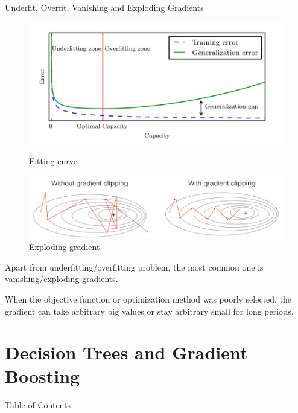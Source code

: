 \documentclass{beamer}
\theoremstyle{remark}
\begin{document}
\begin{frame}{Underfit, Overfit, Vanishing and Exploding Gradients}
    \begin{figure}
        \centering
        \begin{minipage}{0.5\textwidth}
            \centering
            \includegraphics[width=\textwidth]{pictures/train_vs_validate.png}
            \caption{Fitting curve}
        \end{minipage}\hfill
        \begin{minipage}{0.5\textwidth}
            \centering
            \includegraphics[width=\textwidth]{pictures/gradclip.png}
            \caption{Exploding gradient}
        \end{minipage}
    \end{figure}
    
    Apart from underfitting/overfitting problem, the most common one is vanishing/exploding gradients.\vspace{0.1in}
    
    When the objective function or optimization method was poorly selected, the gradient can take arbitrary big values or stay arbitrary small for long periods.
\end{frame}

\section{Decision Trees and Gradient Boosting}

\begin{frame}{Table of Contents}
    \tableofcontents[currentsection]
\end{frame}
\end{document}
